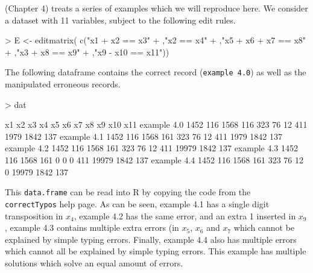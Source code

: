 \documentclass[11pt, fleqn, a4paper]{article}
\begin{document}
%
\cite{scholtus:2009} (Chapter 4) treats a series of examples which we will
reproduce here.  We consider a dataset with 11 variables, subject to the
following edit rules.
\begin{Schunk}
\begin{Sinput}
> E <- editmatrix( c("x1 + x2 == x3"
+                   ,"x2 == x4"
+                   ,"x5 + x6 + x7 == x8"
+                   ,"x3 + x8 == x9"
+                   ,"x9 - x10 == x11"))
\end{Sinput}
\end{Schunk}
%
The following dataframe contains the correct record ({\tt example 4.0}) as well
as the manipulated erroneous records.
\begin{Schunk}
\begin{Sinput}
> dat
\end{Sinput}
\begin{Soutput}
              x1  x2   x3  x4  x5 x6 x7  x8    x9  x10 x11
example 4.0 1452 116 1568 116 323 76 12 411  1979 1842 137
example 4.1 1452 116 1568 161 323 76 12 411  1979 1842 137
example 4.2 1452 116 1568 161 323 76 12 411 19979 1842 137
example 4.3 1452 116 1568 161   0  0  0 411 19979 1842 137
example 4.4 1452 116 1568 161 323 76 12   0 19979 1842 137
\end{Soutput}
\end{Schunk}
This {\tt data.frame} can be read into R by copying the code from the {\tt
correctTypos} help page. As can be seen, example 4.1 has a single digit
transposition in $x_4$, example 4.2 has the same error, and an extra 1 inserted
in $x_9$, example 4.3 contains multiple extra errors (in $x_5$, $x_6$ and $x_7$
which cannot be explained by simple typing errors.  Finally, example 4.4 also
has multiple errors which cannot all be explained by simple typing errors. This
example has multiple solutions which solve an equal amount of errors.
\end{document}
